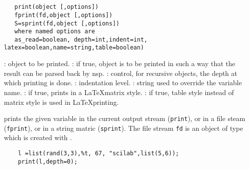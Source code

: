 

\begin{mandesc}
  \\
  \\
\end{mandesc}
\label{print}
\begin{calling_sequence}
\begin{verbatim}
   print(object [,options])
   fprint(fd,object [,options]) 
   S=sprint(fd,object [,options]) 
   where named options are 
   as_read=boolean, depth=int,indent=int, latex=boolean,name=string,table=boolean) 
\end{verbatim}
\end{calling_sequence}

\begin{parameters}
  \begin{varlist}
    : object to be printed.
    : if true, object is to be printed in such a way that the result can be 
    parsed back by nsp.
    : control, for recursive objects, the depth at which printing
    is done.
    : indentation level.
    : string used to override the variable name.
    : if true, prints in a \LaTeX matrix style.
    : if true, table style instead of matrix style is used in \LaTeX printing.
  \end{varlist}
\end{parameters}

\begin{mandescription}
  prints the given variable in the current output stream (\verb+print+), 
  or in a file steam (\verb+fprint+), or in a string matric (\verb+sprint+).
  The file stream \verb+fd+ is an object of type  which 
  is created with .
\end{mandescription}
\begin{examples}
  \begin{Verbatim}
    l =list(rand(3,3),%t, 67, "scilab",list(5,6));
    print(l,depth=0);
  \end{Verbatim}
\end{examples}
\begin{manseealso}
\end{manseealso}

